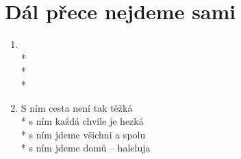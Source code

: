 \section{Dál přece nejdeme sami}
\begin{enumerate}
\item \hspace{0em} \hspace*{0.6\textwidth}\\*
\hspace{0em} \hspace*{0.6\textwidth}\\*
\hspace{0em} \hspace*{0.6\textwidth}\\*
\hspace{0em} \hspace*{0.6\textwidth}
\item S ním cesta není tak těžká \\*
s ním každá chvíle je hezká \\*
s ním jdeme všichni a spolu \\*
s ním jdeme domů -- haleluja 
\end{enumerate}

